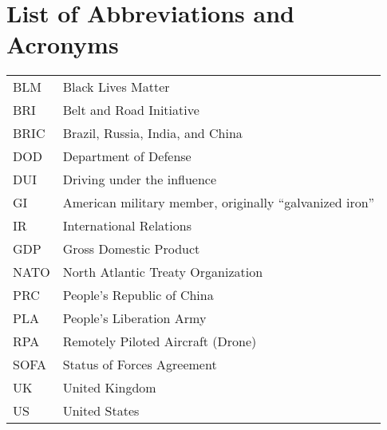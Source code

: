 



\section*{List of Abbreviations and Acronyms}

\begin{tabular}{ll}
	BLM & Black Lives Matter\\
	BRI & Belt and Road Initiative\\
	BRIC & Brazil, Russia, India, and China \\
	DOD & Department of Defense\\
	DUI & Driving under the influence\\
	GI & American military member, originally ``galvanized iron''\\
	IR & International Relations\\
	GDP & Gross Domestic Product\\
	NATO & North Atlantic Treaty Organization\\
	PRC & People's Republic of China\\
	PLA & People's Liberation Army\\
	RPA & Remotely Piloted Aircraft (Drone)\\
	SOFA & Status of Forces Agreement\\
	UK & United Kingdom \\
	US & United States\\
\end{tabular}







